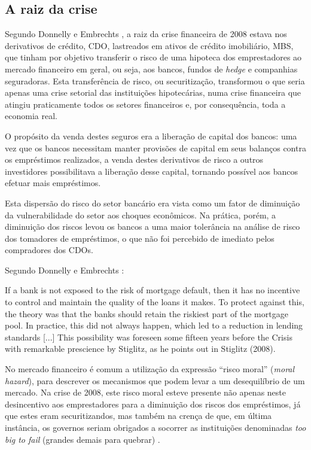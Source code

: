 \documentclass[
	12pt,				%
	oneside,			%
	a4paper,			%
	chapter=TITLE,		%
	section=TITLE,		%
	english,			%
	brazil				%
	]{abntex2}
\begin{document}
\hypertarget{a-raiz-da-crise}{%
\subsection{A raiz da crise}\label{a-raiz-da-crise}}

Segundo Donnelly e Embrechts \autocite*[3]{devil}, a raiz da crise financeira de 2008
estava nos derivativos de crédito, \gls{CDO}, lastreados em ativos de crédito
imobiliário, \gls{MBS}, que tinham por objetivo transferir o risco de uma
hipoteca dos emprestadores ao mercado financeiro em geral, ou seja, aos bancos,
fundos de \emph{hedge} e companhias seguradoras. Esta transferência de risco, ou
securitização, transformou o que seria apenas uma crise setorial das
instituições hipotecárias, numa crise financeira que atingiu praticamente todos
os setores financeiros e, por consequência, toda a economia real.

O propósito da venda destes seguros era a liberação de capital dos bancos: uma
vez que os bancos necessitam manter provisões de capital em seus balanços contra
os empréstimos realizados, a venda destes derivativos de risco a outros
investidores possibilitava a liberação desse capital, tornando possível aos
bancos efetuar mais empréstimos.

Esta dispersão do risco do setor bancário era vista como um fator de diminuição
da vulnerabilidade do setor aos choques econômicos. Na prática, porém, a
diminuição dos riscos levou os bancos a uma maior tolerância na análise de
risco dos tomadores de empréstimos, o que não foi percebido de imediato pelos
compradores dos \gls{CDO}s.

Segundo Donnelly e Embrechts \autocite*[5]{devil}:
\begin{citacao}
If a bank is not exposed to the risk of mortgage default, then it has no
incentive to control and maintain the quality of the loans it makes. To protect
against this, the theory was that the banks should retain the riskiest part of
the mortgage pool. In practice, this did not always happen, which led to a
reduction in lending standards [...] This possibility was foreseen some fifteen
years before the Crisis with remarkable prescience by Stiglitz, as he points out
in Stiglitz (2008).
\end{citacao}
No mercado financeiro é comum a utilização da expressão ``risco moral'' (\emph{moral
hazard}), para descrever os mecanismos que podem levar a um desequilíbrio de um
mercado. Na crise de 2008, este risco moral esteve presente não apenas neste
desincentivo aos emprestadores para a diminuição dos riscos dos empréstimos, já
que estes eram securitizandos, mas também na crença de que, em última instância,
os governos seriam obrigados a socorrer as instituições denominadas \emph{too big to
fail} (grandes demais para quebrar) \autocite[4-5]{devil}.
\end{document}
